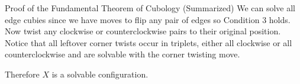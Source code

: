 \documentclass[final]{beamer}
\newlength{\colwidth}
\begin{document}
\begin{frame}[t]
\begin{columns}[t]
\begin{column}{\colwidth}
\begin{block}{Proof of the Fundamental Theorem of Cubology (Summarized)}
We can solve all edge cubies since we have moves to flip any pair of edges so Condition $3$ holds.
Now twist any clockwise or counterclockwise pairs to their original position.
Notice that all leftover corner twists occur in triplets, either all clockwise or all counterclockwise and are solvable with the corner twisting move.

Therefore $X$ is a solvable configuration.

  \end{block}






\end{column}
\end{columns}
\end{frame}
\end{document}
